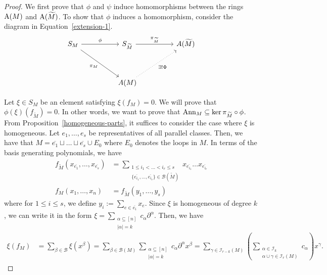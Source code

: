 \documentclass{puthesis-UG}
\begin{document}
\begin{proof}
	We first prove that $\phi$ and $\psi$ induce homomorphisms between the rings $\operatorname{A}(M)$ and $\operatorname{A}(\widetilde{M})$. To show that $\phi$ induces a homomorphism, consider the diagram in Equation~\ref{extension-1}.
	\begin{equation} \label{extension-1}
			\begin{tikzcd}
				{S_M} && {S_{\widetilde{M}}} && {A(\widetilde{M})} \\
				\\
				&& {A(M)}
				\arrow["\phi", from=1-1, to=1-3]
				\arrow["{\pi_{\widetilde{M}}}", from=1-3, to=1-5]
				\arrow["{\pi_M}"', from=1-1, to=3-3]
				\arrow["{\exists ! \Phi}"', dotted, from=3-3, to=1-5]
			\end{tikzcd}
	\end{equation}
		

Let $\xi \in S_M$ be an element satisfying $\xi (f_M) = 0$. We will prove that $\phi(\xi) (f_{\widetilde{M}}) = 0$. In other words, we want to prove that $\operatorname{Ann}_M \subseteq \ker \pi_{\widetilde{M}} \circ \phi$. From Proposition~\ref{homogeneous-parts}, it suffices to consider the case where $\xi$ is homogeneous. Let $e_1, \ldots, e_s$ be representatives of all parallel classes. Then, we have that $M = \overline{e_1} \sqcup \ldots \sqcup \overline{e_s} \cup E_0$ where $E_0$ denotes the loops in $M$. In terms of the basis generating polynomials, we have 
\begin{align*}
	f_{\widetilde{M}}(x_{\overline{e_1}}, \ldots, x_{\overline{e_s}}) & = \sum_{\substack{1 \leq i_1 < \ldots < i_r \leq s \\ \{\overline{e_{i_1}}, \ldots, \overline{e_{i_r}}\} \in \mathcal{B}(\widetilde{M})}} x_{\overline{e_{i_1}}} \ldots x_{\overline{e_{i_r}}} \\ 
	f_M(x_1, \ldots, x_n) & = f_{\widetilde{M}} \left ( y_1, \ldots, y_s \right )
\end{align*}
where for $1 \leq i \leq s$, we define $y_i := \sum_{e \in \overline{e_i}} x_e$. Since $\xi$ is homogeneous of degree $k$, we can write it in the form $\xi = \sum_{\substack{\alpha \subseteq [n] \\ |\alpha| = k}} c_\alpha \partial^\alpha$. Then, we have 
\begin{align} \label{karen}
	\xi (f_M) & = \sum_{\beta \in \mathcal{B}} \xi (x^\beta) = \sum_{\beta \in \mathcal{B}(M)} \sum_{\substack{\alpha \subseteq [n] \\ |\alpha| = k}} c_\alpha \partial^\alpha x^\beta = \sum_{\gamma \in \mathcal{I}_{r-k}(M)} \left ( \sum_{ \substack{\alpha \in \mathcal{I}_k \\ \alpha \cup \gamma \in \mathcal{I}_r(M)}} c_\alpha  \right ) x^\gamma. 
\end{align}


\end{proof}
\end{document}
